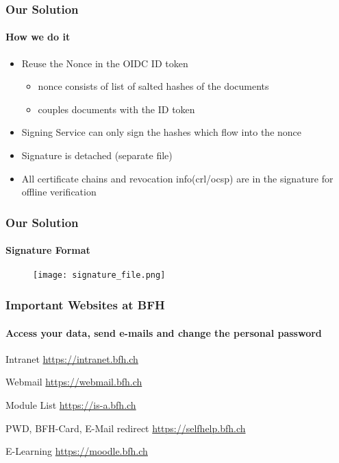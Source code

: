 \begin{frame}[t]\frametitle{Our Solution}
	\framesubtitle{How we do it}
	\begin{itemize}
		\item Reuse the Nonce in the OIDC ID token
		\begin{itemize}
			\item nonce consists of list of salted hashes of the documents
			\item couples documents with the ID token
		\end{itemize}
		\item Signing Service can only sign the hashes which flow into the nonce
		\item Signature is detached (separate file)
		\item All certificate chains and revocation info(crl/ocsp) are in the signature for offline verification
	\end{itemize}
\end{frame}

\begin{frame}[t]\frametitle{Our Solution}
	\framesubtitle{Signature Format}
	\begin{figure}[ht]
		\centering
		\texttt{[image: signature\_file.png]}
	\end{figure}
\end{frame}

\begin{frame}[c]\frametitle{Important Websites at BFH}
  \framesubtitle{Access your data, send e-mails and change the personal password}
  \begin{block}{Intranet}
    \url{https://intranet.bfh.ch}
  \end{block}
  \begin{alertblock}{Webmail}
    \url{https://webmail.bfh.ch}
  \end{alertblock}
  \begin{block}{Module List}
    \url{https://is-a.bfh.ch}
  \end{block}
  \begin{alertblock}{PWD, BFH-Card, E-Mail redirect}
    \url{https://selfhelp.bfh.ch}
  \end{alertblock}
  \begin{block}{E-Learning}
    \url{https://moodle.bfh.ch}
  \end{block}
\end{frame}

